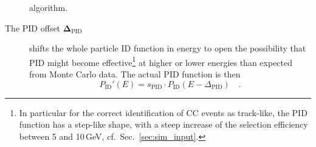 \begin{description}
  algorithm.
 \item[The PID offset $\mathbf{\Delta_\mathrm{PID}}$] shifts the whole particle
  ID function in energy to open the possibility that PID might become
  effective\footnote{In particular for the correct identification of \numu CC
  events as track-like, the PID function has a step-like shape, with a steep
  increase of the selection efficiency between 5 and 10\,GeV, cf.\
  Sec.~\ref{sec:sim_input}.} at higher or lower energies than expected from
  Monte Carlo data. The actual PID function is then
  \begin{equation}
    P_\mathrm{ID}'(E) = s_\mathrm{PID}\cdot P_\mathrm{ID}(E-\Delta_\mathrm{PID})
      \quad.
  \end{equation}
\end{description}

